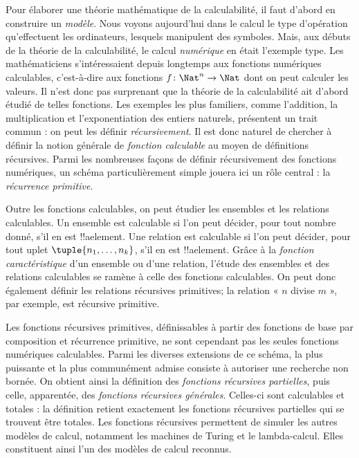 \documentclass[../../../include/open-logic-section]{subfiles}
\begin{document}

Pour élaborer une théorie mathématique de la calculabilité, il faut
d'abord en construire un \emph{modèle}. Nous voyons aujourd'hui dans
le calcul le type d'opération qu'effectuent les ordinateurs, lesquels
manipulent des symboles. Mais, aux débuts de la théorie de la
calculabilité, le calcul \emph{numérique} en était l'exemple type.
Les mathématiciens s'intéressaient depuis longtemps aux fonctions
numériques calculables, c'est-à-dire aux fonctions
$f\colon\Nat^n\to\Nat$ dont on peut calculer les valeurs. Il n'est
donc pas surprenant que la théorie de la calculabilité ait d'abord
étudié de telles fonctions. Les exemples les plus familiers,
comme l'addition, la multiplication et l'exponentiation des entiers
naturels, présentent un trait commun : on peut les définir
\emph{récursivement}. Il est donc naturel de chercher à définir la
notion générale de \emph{fonction calculable} au moyen de définitions
récursives. Parmi les nombreuses façons de définir récursivement des
fonctions numériques, un schéma particulièrement simple jouera ici
un rôle central : la \emph{récurrence primitive}.

Outre les fonctions calculables, on peut étudier les ensembles et
les relations calculables. Un ensemble est calculable si l'on peut
décider, pour tout nombre donné, s'il en est !!a{element}. Une
relation est calculable si l'on peut décider, pour tout uplet
$\tuple{n_1,\dots,n_k}$, s'il en est !!a{element}. Grâce à la
\emph{fonction caractéristique} d'un ensemble ou d'une relation,
l'étude des ensembles et des relations calculables se ramène à
celle des fonctions calculables. On peut donc également définir
les relations récursives primitives; la relation « $n$ divise
$m$ », par exemple, est récursive primitive.

Les fonctions récursives primitives, définissables à partir des fonctions de base par
composition et récurrence primitive, ne sont cependant pas les seules
fonctions numériques calculables. Parmi les diverses extensions de
ce schéma, la plus puissante et la plus communément admise consiste
à autoriser une recherche non bornée. On obtient ainsi la définition
des \emph{fonctions récursives partielles}, puis celle, apparentée,
des \emph{fonctions récursives générales}. Celles-ci sont calculables
et totales : la définition retient exactement les fonctions
récursives partielles qui se trouvent être totales. Les fonctions
récursives permettent de simuler les autres modèles de calcul,
notamment les machines de Turing et le lambda-calcul. Elles
constituent ainsi l'un des modèles de calcul reconnus.
\end{document}
